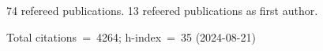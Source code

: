 74 refereed publications. 13 refeered publications as first author.

Total citations~=~4264; h-index~=~35 (2024-08-21)